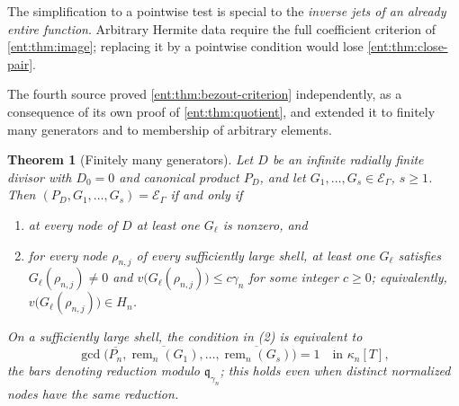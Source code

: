 \documentclass[11pt]{article}
\newtheorem{theorem}{Theorem}[section]
\theoremstyle{plain}
\theoremstyle{plain}
\theoremstyle{plain}
\theoremstyle{definition}
\theoremstyle{definition}
\theoremstyle{definition}
\theoremstyle{definition}
\theoremstyle{remark}
\newcommand{\E}{\mathcal E_\Gamma}
\DeclareMathOperator{\remp}{rem}\DeclareMathOperator{\Res}{Res}
\begin{document}
The simplification to a pointwise test is special to the \emph{inverse jets of
an already entire function}. Arbitrary Hermite data require the full
coefficient criterion of \cref{ent:thm:image}; replacing it by a pointwise
condition would lose \cref{ent:thm:close-pair}.

The fourth source proved \cref{ent:thm:bezout-criterion} independently, as a
consequence of its own proof of \cref{ent:thm:quotient}, and extended it to
finitely many generators and to membership of arbitrary elements.

\begin{theorem}[Finitely many generators]\label{ent:sm:thm:finite-generators}
Let $D$ be an infinite radially finite divisor with $D_0=0$ and canonical
product $P_D$, and let $G_1,\ldots,G_s\in\E$, $s\ge1$. Then
$(P_D,G_1,\ldots,G_s)=\E$ if and only if
\begin{enumerate}[label=\textnormal{(\arabic*)},leftmargin=2em]
\item at every node of $D$ at least one $G_\ell$ is nonzero, and
\item for every node $\rho_{n,j}$ of every sufficiently large shell, at least
one $G_\ell$ satisfies $G_\ell(\rho_{n,j})\ne0$ and
$v\bigl(G_\ell(\rho_{n,j})\bigr)\le c\gamma_n$ for some integer $c\ge0$;
equivalently, $v\bigl(G_\ell(\rho_{n,j})\bigr)\in H_n$.
\end{enumerate}
On a sufficiently large shell, the condition in (2) is equivalent to
\[
 \gcd\bigl(\overline{P_n},\overline{\remp_n(G_1)},\ldots,
   \overline{\remp_n(G_s)}\bigr)=1\quad\text{in }\kappa_n[T],
\]
the bars denoting reduction modulo $\mathfrak q_{\gamma_n}$; this holds even
when distinct normalized nodes have the same reduction.
\end{theorem}
\end{document}
